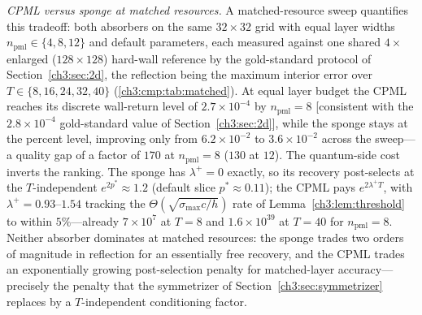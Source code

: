 
\emph{CPML versus sponge at matched resources.}  A matched-resource
sweep quantifies this tradeoff: both absorbers on the same $32\times32$
grid with equal layer widths $n_{\mathrm{pml}}\in\{4,8,12\}$ and
default parameters, each measured against one shared $4\times$ enlarged
($128\times128$) hard-wall reference by the gold-standard protocol of
Section~\ref{ch3:sec:2d}, the reflection being the maximum interior error over
$T\in\{8,16,24,32,40\}$ (\ref{ch3:cmp:tab:matched}).  At equal layer
budget the CPML reaches its discrete wall-return level of
$2.7\times10^{-4}$ by $n_{\mathrm{pml}}=8$ [consistent with the
$2.8\times10^{-4}$ gold-standard value of Section~\ref{ch3:sec:2d}], while the
sponge stays at the percent level, improving only from
$6.2\times10^{-2}$ to $3.6\times10^{-2}$ across the sweep---a quality
gap of a factor of $170$ at $n_{\mathrm{pml}}=8$ ($130$ at $12$).  The
quantum-side cost inverts the ranking.  The sponge has $\lambda^{+}=0$
exactly, so its recovery post-selects at the $T$-independent
$e^{2p^{*}}\approx1.2$ (default slice $p^{*}\approx0.11$); the CPML
pays $e^{2\lambda^{+}T}$, with $\lambda^{+}=0.93$--$1.54$ tracking the
$\Theta(\sqrt{\sigma_{\max}c/h})$ rate of Lemma~\ref{ch3:lem:threshold} to
within $5\%$---already $7\times10^{7}$ at $T=8$ and $1.6\times10^{39}$
at $T=40$ for $n_{\mathrm{pml}}=8$.  Neither absorber dominates at
matched resources: the sponge trades two orders of magnitude in
reflection for an essentially free recovery, and the CPML trades an
exponentially growing post-selection penalty for matched-layer
accuracy---precisely the penalty that the symmetrizer of
Section~\ref{ch3:sec:symmetrizer} replaces by a $T$-independent conditioning
factor.

